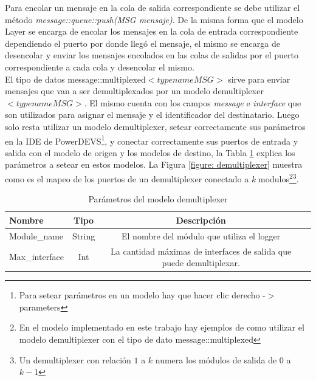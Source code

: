 \documentclass[10pt,a4paper]{article}
\begin{document}
Para encolar un mensaje en la cola de salida correspondiente se debe utilizar el método \textit{message::queue::push(MSG mensaje)}. De la misma forma que el modelo Layer se encarga de encolar los mensajes en la cola de entrada correspondiente dependiendo el puerto por donde llegó el mensaje, el mismo se encarga de desencolar y enviar los mensajes encolados en las colas de salidas por el puerto correspondiente a cada cola y desencolar el mismo. \\

El tipo de datos message::multiplexed$<typename MSG>$ sirve para enviar mensajes que van a ser demultiplexados por un modelo demultiplexer$<typename MSG>$. El mismo cuenta con los campos \textit{message} e \textit{interface} que son utilizados para asignar el mensaje y el identificador del destinatario. Luego solo resta utilizar un modelo demultiplexer, setear correctamente sus parámetros en la IDE de PowerDEVS\footnote{Para setear parámetros en un modelo hay que hacer clic derecho -$>$ parameters}, y conectar correctamente sus puertos de entrada y salida con el modelo de origen y los modelos de destino, la Tabla \ref{table: parameter demultiplexer} explica los parámetros a setear en estos modelos. La Figura \ref{figure: demultiplexer} muestra como es el mapeo de los puertos de un demultiplexer conectado a \textit{k} modulos\footnote{En el modelo implementado en este trabajo hay ejemplos de como utilizar el modelo demultiplexer con el tipo de dato message::multiplexed}\footnote{Un demultiplexer con relación $1$ a $k$ numera los módulos de salida de $0$ a $k-1$}. \\

\begin{table}[h]
	\begin{tabular}{|l|c|c|c|}
  		\hline
  		\textbf{Nombre} & \textbf{Tipo} & \textbf{Descripción} \\
  		\hline
  		Module\_name & String & El nombre del módulo que utiliza el logger \\
  		\hline
  		Max\_interface & Int & La cantidad máximas de interfaces de salida que puede demultiplexar. \\
  		\hline
	\end{tabular}
	\caption{Parámetros del modelo demultiplexer}
	\label{table: parameter demultiplexer}
\end{table}
\end{document}
